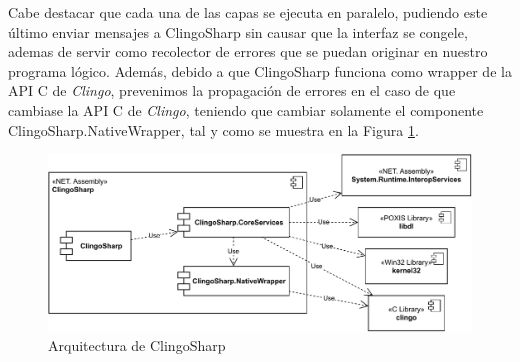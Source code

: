 Cabe destacar que cada una de las capas se ejecuta en paralelo, pudiendo este último enviar mensajes a ClingoSharp sin causar que la interfaz se congele, ademas de servir como recolector de errores que se puedan originar en nuestro programa lógico. Además, debido a que ClingoSharp funciona como wrapper de la API C de \textit{Clingo}, prevenimos la propagación de errores en el caso de que cambiase la API C de \textit{Clingo}, teniendo que cambiar solamente el componente ClingoSharp.NativeWrapper, tal y como se muestra en la Figura \ref{fig:clingosharp}. \\

\begin{figure}[!h]
	\centering
	\includegraphics[width=\textwidth]{images/clingosharp.pdf}
	\caption{Arquitectura de ClingoSharp}
	\label{fig:clingosharp}
\end{figure}